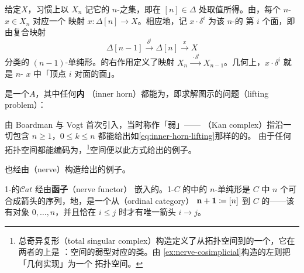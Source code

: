 给定\trSimplicialSet $X$，习惯上以 $X_n$ 记它的 $n$-\trSimplex{}之集，即在 $[n]\in\Delta$
处取值所得。由\trYonedaLemma{}，每个 $n$-\trSimplex{} $x\in X_n$ 对应一个\trSimplicialSet
映射 $x\colon\Delta[n]\to X$。相应地，记 $x\cdot\delta^i$ 为该 $n$-\trSimplex{}的
第 $i$ 个面，即由复合映射
\[
\Delta[n-1]\xrightarrow{\;\delta^i\;}\Delta[n]\xrightarrow{\;x\;}X
\]
分类的 $(n-1)$-单纯形。\trFaceOperator{}的右作用定义了映射
$X_n\xrightarrow{\;\cdot\delta^i\;}X_{n-1}$。几何上，$x\cdot\delta^i$
就是 $n$-\trSimplex{} $x$ 中「顶点 $i$ 对面的面」。

\begin{definition}[\trQuasiCategory]\label{def:quasi-category}
\trQuasiCategory{}是一个\trSimplicialSet $A$，其中任何\textbf{内\trHorn}
（inner horn）都能\trExtension{}为\trSimplex{}，即求解图示的\trLifting{}问题（lifting problem）：
\end{definition}

\trQuasiCategory{}由 Boardman 与 Vogt 首次引入\cite{bib21}，当时称作「弱\trKanComplex」——
\textbf{\trKanComplex}（Kan complex）指沿一切\trHorn{}包含 $n\ge 1$，$0\le k\le n$
都能给出如\eqref{eq:inner-horn-lifting}那样的\trExtension{}的\trSimplicialSet{}。
由于任何拓扑空间都能编码为\trKanComplex{}，\footnote{总奇异复形（total singular
complex）构造定义了从拓扑空间到\trSimplicialSet{}的一个\trFunctor{}，它在两者的\trHomotopyCategory{}上是%
\trEquivalence{}：空间的弱\trHomotopy{}型对应\trKanComplex{}的\trHomotopy\trEquivalence{}类\cite{bib93}。由
\cref{ex:nerve-cosimplicial}构造的左\trAdjunction{}则把\trSimplicialSet{}「几何实现」为一个
拓扑空间。}空间便以此方式给出\trQuasiCategory{}的例子。

\trCategory{}也经由\trNerve{}（nerve）构造给出\trQuasiCategory{}的例子。

\begin{definition}[\trNerve]\label{def:nerve}
1-\trCategory{}的\trCategory $\mathcal{C}at$ 经由\textbf{\trNerve{}函子}（nerve functor）
\trFullyFaithful{}嵌入\trSimplicialSet{}的\trCategory{}。1-\trCategory $C$ 的\trNerve{}中的 $n$-单纯形是 $C$ 中
$n$ 个可合成箭头的序列，\trEquivalence{}地，是一个从\trOrdinalCategory{}（ordinal category）
$\mathbf{n}+\mathbf{1}\coloneqq[n]$ 到 $C$ 的\trFunctor——该\trCategory{}有对象
$0,\ldots,n$，并且恰在 $i\le j$ 时才有唯一箭头 $i\to j$。
\end{definition}

